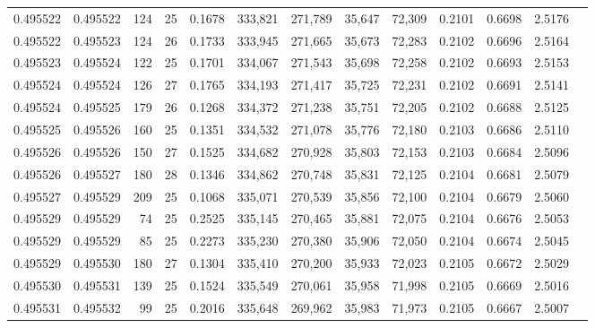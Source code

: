 \begin{tabular}{rrrrrrrrrrrrr}
0.495522 & 0.495522 & 124 &  25 &                                     0.1678 & 333,821 & 271,789 &  35,647 &  72,309 & 0.2101 & 0.6698 & 2.5176 \\
0.495522 & 0.495523 & 124 &  26 &                                     0.1733 & 333,945 & 271,665 &  35,673 &  72,283 & 0.2102 & 0.6696 & 2.5164 \\
0.495523 & 0.495524 & 122 &  25 &                                     0.1701 & 334,067 & 271,543 &  35,698 &  72,258 & 0.2102 & 0.6693 & 2.5153 \\
0.495524 & 0.495524 & 126 &  27 &                                     0.1765 & 334,193 & 271,417 &  35,725 &  72,231 & 0.2102 & 0.6691 & 2.5141 \\
0.495524 & 0.495525 & 179 &  26 &                                     0.1268 & 334,372 & 271,238 &  35,751 &  72,205 & 0.2102 & 0.6688 & 2.5125 \\
0.495525 & 0.495526 & 160 &  25 &                                     0.1351 & 334,532 & 271,078 &  35,776 &  72,180 & 0.2103 & 0.6686 & 2.5110 \\
0.495526 & 0.495526 & 150 &  27 &                                     0.1525 & 334,682 & 270,928 &  35,803 &  72,153 & 0.2103 & 0.6684 & 2.5096 \\
0.495526 & 0.495527 & 180 &  28 &                                     0.1346 & 334,862 & 270,748 &  35,831 &  72,125 & 0.2104 & 0.6681 & 2.5079 \\
0.495527 & 0.495529 & 209 &  25 &                                     0.1068 & 335,071 & 270,539 &  35,856 &  72,100 & 0.2104 & 0.6679 & 2.5060 \\
0.495529 & 0.495529 &  74 &  25 &                                     0.2525 & 335,145 & 270,465 &  35,881 &  72,075 & 0.2104 & 0.6676 & 2.5053 \\
0.495529 & 0.495529 &  85 &  25 &                                     0.2273 & 335,230 & 270,380 &  35,906 &  72,050 & 0.2104 & 0.6674 & 2.5045 \\
0.495529 & 0.495530 & 180 &  27 &                                     0.1304 & 335,410 & 270,200 &  35,933 &  72,023 & 0.2105 & 0.6672 & 2.5029 \\
0.495530 & 0.495531 & 139 &  25 &                                     0.1524 & 335,549 & 270,061 &  35,958 &  71,998 & 0.2105 & 0.6669 & 2.5016 \\
0.495531 & 0.495532 &  99 &  25 &                                     0.2016 & 335,648 & 269,962 &  35,983 &  71,973 & 0.2105 & 0.6667 & 2.5007 \\

\end{tabular}

